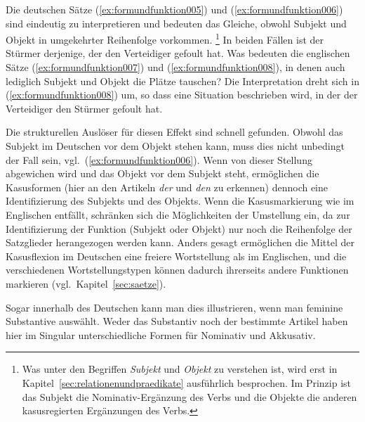 Die deutschen Sätze (\ref{ex:formundfunktion005}) und (\ref{ex:formundfunktion006}) sind eindeutig zu interpretieren und bedeuten das Gleiche, obwohl Subjekt und Objekt in umgekehrter Reihenfolge vorkommen.%
\footnote{Was unter den Begriffen \textit{Subjekt} und \textit{Objekt} zu verstehen ist, wird erst in Kapitel~\ref{sec:relationenundpraedikate} ausführlich besprochen.
Im Prinzip ist das Subjekt die Nominativ-Ergänzung des Verbs und die Objekte die anderen kasusregierten Ergänzungen des Verbs.}
In beiden Fällen ist der Stürmer derjenige, der den Verteidiger gefoult hat.
Was bedeuten die englischen Sätze (\ref{ex:formundfunktion007}) und (\ref{ex:formundfunktion008}), in denen auch lediglich Subjekt und Objekt die Plätze tauschen?
Die Interpretation dreht sich in (\ref{ex:formundfunktion008}) um, so dass eine Situation beschrieben wird, in der der Verteidiger den Stürmer gefoult hat.

Die strukturellen Auslöser für diesen Effekt sind schnell gefunden.
Obwohl das Subjekt im Deutschen vor dem Objekt stehen kann, muss dies nicht unbedingt der Fall sein, vgl.\ (\ref{ex:formundfunktion006}).
Wenn von dieser Stellung abgewichen wird und das Objekt vor dem Subjekt steht, ermöglichen die Kasusformen (hier an den Artikeln \textit{der} und \textit{den} zu erkennen) dennoch eine Identifizierung des Subjekts und des Objekts.
Wenn die Kasusmarkierung wie im Englischen entfällt, schränken sich die Möglichkeiten der Umstellung ein, da zur Identifizierung der Funktion (Subjekt oder Objekt) nur noch die Reihenfolge der Satzglieder herangezogen werden kann.
Anders gesagt ermöglichen die Mittel der Kasusflexion im Deutschen eine freiere Wortstellung als im Englischen, und die verschiedenen Wortstellungstypen können dadurch ihrerseits andere Funktionen markieren (vgl.\ Kapitel~\ref{sec:saetze}).

Sogar innerhalb des Deutschen kann man dies illustrieren, wenn man \zB feminine Substantive auswählt.
Weder das Substantiv noch der bestimmte Artikel haben hier im Singular unterschiedliche Formen für Nominativ und Akkusativ.

\begin{exe}
  \ex \label{ex:formundfunktion009}
  \begin{xlist}
  \end{xlist}
\end{exe}

